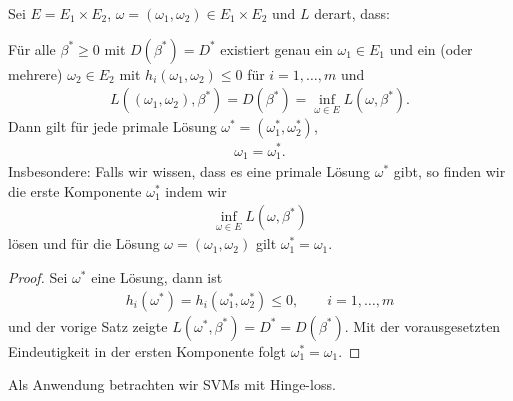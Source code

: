 \begin{cor*}
Sei $E=E_1\times E_2$, $\omega=(\omega_1,\omega_2)\in E_1\times E_2$ und $L$
derart, dass:

Für alle $\beta^*\ge 0$ mit $D(\beta^*) = D^*$ existiert genau ein $\omega_1\in
E_1$ und ein (oder mehrere) $\omega_2\in E_2$ mit $h_i(\omega_1,\omega_2)\le 0$
für $i=1,\ldots,m$ und
\begin{align*}
L((\omega_1,\omega_2),\beta^*) = D(\beta^*) = \inf_{\omega\in E}
L(\omega,\beta^*).
\end{align*}
Dann gilt für jede primale Lösung $\omega^*=(\omega_1^*,\omega_2^*)$,
\begin{align*}
\omega_1 = \omega_1^*.
\end{align*}
Insbesondere: Falls wir wissen, dass es eine primale Lösung $\omega^*$ gibt, so
finden wir die erste Komponente $\omega_1^*$ indem wir
\begin{align*}
\inf_{\omega\in E} L(\omega,\beta^*)
\end{align*}
lösen und für die Lösung $\omega=(\omega_1,\omega_2)$ gilt $\omega_1^* =
\omega_1$.\fishhere
\end{cor*}
\begin{proof}
Sei $\omega^*$ eine Lösung, dann ist
\begin{align*}
h_i(\omega^*) = h_i(\omega_1^*,\omega_2^*) \le 0,\qquad i=1,\ldots,m
\end{align*}
und der vorige Satz zeigte $L(\omega^*,\beta^*) = D^*= D(\beta^*)$. Mit der
vorausgesetzten Eindeutigkeit in der ersten Komponente folgt $\omega_1^* =
\omega_1$.\qedhere
\end{proof}

Als Anwendung betrachten wir SVMs mit Hinge-loss.

